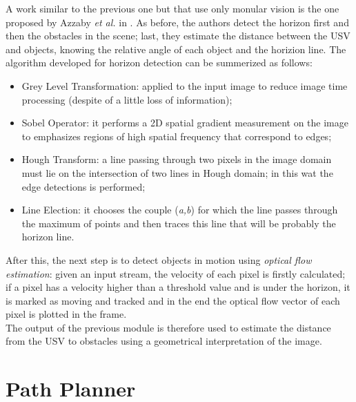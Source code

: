 \documentclass[journal]{IEEEtran}
\begin{document}
      \indent A work similar to the previous one but that use only monular vision is the one proposed by Azzaby \textit{et al.} in \parencite{Azzabi}. As before, the authors detect the horizon first and then the obstacles in the scene; last, they estimate the distance between the USV and objects, knowing the relative angle of each object and the horizion line. The algorithm developed for horizon detection can be summerized as follows:
            \begin{itemize}
                  \item Grey Level Transformation: applied to the input image to reduce image time processing (despite of a little loss of information);
                  \item Sobel Operator: it performs a 2D spatial gradient measurement on the image to emphasizes regions of high spatial frequency that correspond to edges;
                  \item Hough Transform: a line passing through two pixels in the image domain must lie on the intersection of two lines in Hough domain; in this wat the edge detections is performed;
                  \item Line Election: it chooses the couple (\textit{a,b}) for which the line passes through the maximum of points and then traces this line that will be probably the horizon line.
            \end{itemize}
      \indent After this, the next step is to detect objects in motion using \textit{optical flow estimation}: given an input stream, the velocity of each pixel is firstly calculated; if a pixel has a velocity higher than a threshold value and is under the horizon, it is marked as moving and tracked and in the end the optical flow vector of each pixel is plotted in the frame.\\
      \indent The output of the previous module is therefore used to estimate the distance from the USV to obstacles using a geometrical interpretation of the image.

\section{Path Planner} \label{path_planner}
\end{document}
